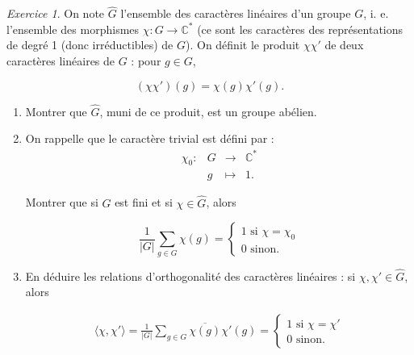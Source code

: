\documentclass[french]{book}
\theoremstyle{definition}
\theoremstyle{remark}
\newtheorem{exo}{Exercice}
\begin{document}
\begin{exo}
  On note \(\hat{G}\) l'ensemble des caractères linéaires d'un groupe \(G\), i. e. l'ensemble des morphismes \(\chi : G \longrightarrow \mathbb{C} ^{*}\) (ce sont les caractères des représentations de degré 1 (donc irréductibles) de \(G\)). On définit le produit \(\chi\chi'\) de deux caractères linéaires de \(G\) : pour \(g \in G\),

  \[(\chi \chi')(g) = \chi(g)\chi'(g).\]

  \begin{enumerate}
    \item Montrer que \(\hat{G}\), muni  de ce produit, est un groupe abélien.
    \item On rappelle que le caractère trivial  est défini par :
    \[\begin{matrix}
    \chi_0 : & G & \longrightarrow & \mathbb{C} ^{*} \\
    \ & g & \longmapsto & 1.
    \end{matrix}\]

    Montrer que si \(G\) est fini et si \(\chi \in \hat{G}\), alors

    \[\frac{1}{\lvert G \rvert} \sum_{g \in G}^{} \chi(g) = \begin{cases}
      1 \text{ si } \chi = \chi_0 \\
      0 \text{ sinon. }
    \end{cases}\]

    \item En déduire les relations d'orthogonalité des caractères linéaires : si \(\chi, \chi' \in \hat{G}\), alors

    \begin{gather*}
      \langle \chi, \chi' \rangle = \frac{1}{\lvert G \rvert} \sum_{g \in G}^{}  \overline{\chi(g)} \chi'(g) = \begin{cases}
        1 \text{ si } \chi = \chi' \\
        0 \text{ sinon. }
      \end{cases}
    \end{gather*}
  \end{enumerate}

  \end{exo}
\end{document}

